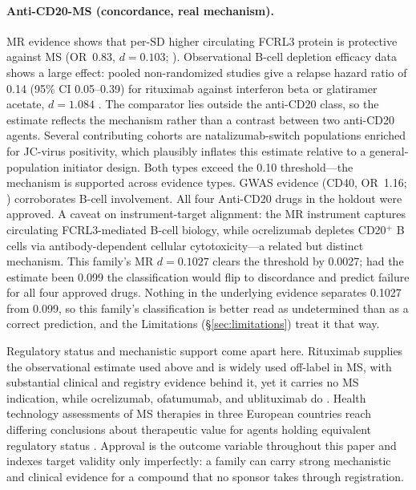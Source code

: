 \documentclass[11pt]{article}
\begin{document}
\paragraph{Anti-CD20-MS (concordance, real mechanism).} MR evidence shows that per-SD higher circulating FCRL3 protein is protective against MS (OR~0.83, $d = 0.103$; \cite{lin2023}). Observational B-cell depletion efficacy data shows a large effect: pooled non-randomized studies give a relapse hazard ratio of 0.14 (95\% CI 0.05--0.39) for rituximab against interferon beta or glatiramer acetate, $d = 1.084$ \cite{hu2019}. The comparator lies outside the anti-CD20 class, so the estimate reflects the mechanism rather than a contrast between two anti-CD20 agents. Several contributing cohorts are natalizumab-switch populations enriched for JC-virus positivity, which plausibly inflates this estimate relative to a general-population initiator design. Both types exceed the 0.10 threshold---the mechanism is supported across evidence types. GWAS evidence (CD40, OR~1.16; \cite{sokolova2013}) corroborates B-cell involvement. All four Anti-CD20 drugs in the holdout were approved. A caveat on instrument-target alignment: the MR instrument captures circulating FCRL3-mediated B-cell biology, while ocrelizumab depletes CD20$^+$ B cells via antibody-dependent cellular cytotoxicity---a related but distinct mechanism. This family's MR $d = 0.1027$ clears the threshold by 0.0027; had the estimate been 0.099 the classification would flip to discordance and predict failure for all four approved drugs. Nothing in the underlying evidence separates 0.1027 from 0.099, so this family's classification is better read as undetermined than as a correct prediction, and the Limitations (\S\ref{sec:limitations}) treat it that way.

Regulatory status and mechanistic support come apart here. Rituximab supplies the observational estimate used above and is widely used off-label in MS, with substantial clinical and registry evidence behind it, yet it carries no MS indication, while ocrelizumab, ofatumumab, and ublituximab do \cite{brancati2021rituximab}. Health technology assessments of MS therapies in three European countries reach differing conclusions about therapeutic value for agents holding equivalent regulatory status \cite{gozzo2023htams}. Approval is the outcome variable throughout this paper and indexes target validity only imperfectly: a family can carry strong mechanistic and clinical evidence for a compound that no sponsor takes through registration.
\end{document}
